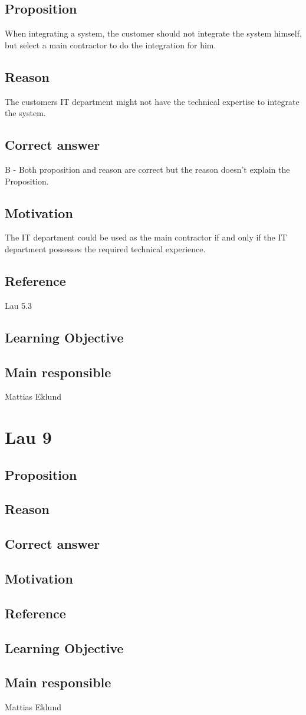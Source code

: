 \documentclass[a4paper]{article}
\begin{document}
	\subsection{Proposition}
		When integrating a system, the customer should not integrate the system himself, but select a main contractor to do the integration for him.
	\subsection{Reason}
		The customers IT department might not have the technical expertise to integrate the system.
	\subsection{Correct answer}
		B - Both proposition and reason are correct but the reason doesn't explain the Proposition.
	\subsection{Motivation}
		The IT department could be used as the main contractor if and only if the IT department possesses the required technical experience.
	\subsection{Reference}
		Lau 5.3
	\subsection{Learning Objective}
	\subsection{Main responsible}
		Mattias Eklund

\section{Lau 9}
	\subsection{Proposition}

	\subsection{Reason}

	\subsection{Correct answer}

	\subsection{Motivation}

	\subsection{Reference}

	\subsection{Learning Objective}

	\subsection{Main responsible}
		Mattias Eklund
\end{document}
